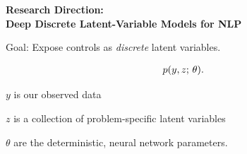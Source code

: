 \documentclass[aspectratio=169,12pt]{beamer}
\let\tempone\itemize
\let\temptwo\enditemize
\renewenvironment{itemize}{\tempone\addtolength{\itemsep}{0.5\baselineskip}}{\temptwo}
\begin{document}












\begin{frame}
\begin{center}
    \textbf{Research Direction: \\
      Deep Discrete Latent-Variable Models for NLP }
  \end{center}
  Goal: Expose controls as \textit{discrete} latent variables.


\begin{align*}
p(y, z ; \, \theta).
\end{align*}

\begin{itemize}
    \item $y$ is our observed data
    \item $z$ is a collection of problem-specific latent variables
    \item $\theta$ are the deterministic, neural network parameters.
\end{itemize}



\end{frame}
\end{document}
